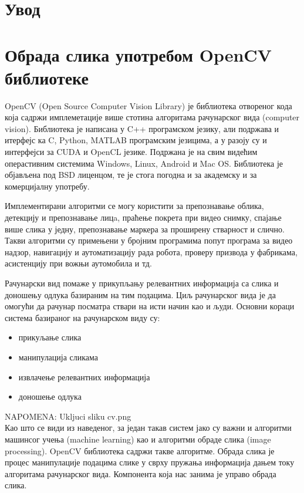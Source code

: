 \documentclass[12pt,a4paper,serbian,oneside]{book}
\begin{document}


\tableofcontents
\newpage

\chapter{Увод}

\chapter{Обрада слика употребом OpenCV библиотеке}

OpenCV (Open Source Computer Vision Library) је библиотека отвореног кода која садржи имплеметације више стотина алгоритама рачунарског вида (computer vision). Библиотека је написана у C++ програмском језику, али подржава и итерфејс ка C, Python, MATLAB програмским језицима, а у разоју су и интерфејси за CUDA и OpenCL језике. Подржана је на свим видећим операстивним системима Windows, Linux, Android и Mac OS. Библиотека је објављена под BSD лиценцом, те је стога погодна  и за академску и за комерцијалну употребу.

Имплементирани алгоритми се могу користити за  препознавање облика, детекцију и препознавање лицa, праћење покрета при видео снимку, спајање више слика у једну, препознавање маркера за проширену стварност и слично. Такви алгоритми су примењени у бројним програмима попут програма за видео надзор, навигацију и аутоматизацију рада робота, проверу призвода у фабрикама, асистенцију при вожњи аутомобила и тд.

Рачунарски вид помаже у прикупљању релевантних информација са слика и доношењу одлука базираним на тим подацима. Циљ рачунарског вида је да омогући да рачунар посматра ствари на исти начин као и људи. Основни кораци система базираног на рачунарском виду су:

\begin{itemize} \itemsep1pt \parskip0pt 
  \item прикуљање слика
  \item манипулација сликама
  \item извлачење релевантних информација
  \item доношење одлука
\end{itemize}

NAPOMENA: Ukljuci sliku cv.png \\

Као што се види из наведеног, за један такав систем јако су важни и алгоритми машинсог учења (machine learning) као и алгоритми обраде слика (image processing). OpenCV библиотека садржи такве алгоритме.
Обрада слика је процес манипулације подацима слике у сврху пружања информација дањем току алгоритама рачунарског вида.
Компонента која нас занима је управо обрада слика. 
\end{document}
